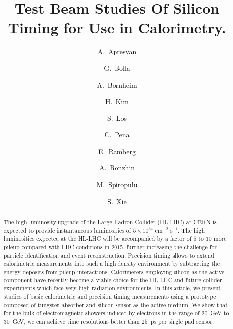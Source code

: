 \documentclass[preprint,1p]{elsarticle}
\begin{document}
\linenumbers

\begin{frontmatter}



\title{Test Beam Studies Of Silicon Timing for Use in Calorimetry.}


\author[1]{A.~Apresyan}
\author[2]{G.~Bolla}
\author[1]{A.~Bornheim}
\author[3]{H.~Kim}
\author[2]{S.~Los}
\author[1]{C.~Pena}
\author[2]{E.~Ramberg}
\author[2]{A.~Ronzhin}
\author[1]{M.~Spiropulu}
\author[1]{S.~Xie}
\address[1]{California Institute of Technology, Pasadena, CA, USA}
\address[2]{Fermi National Accelerator Laboratory, Batavia, IL, USA}
\address[3]{University of Chicago, Chicago, IL,  USA}

\begin{abstract}
The high luminosity upgrade of the Large Hadron Collider (HL-LHC) at CERN is
expected to provide instantaneous luminosities of $5\times 10^{34}$ cm$^{-2}$
s$^{-1}$. The high luminosities expected at the HL-LHC will be accompanied by a
factor of $5$ to $10$ more pileup compared with LHC conditions in $2015$,
further increasing the challenge for particle identification and event
reconstruction. Precision timing allows to extend calorimetric measurements into
such a high density environment by subtracting the energy deposits from pileup
interactions. Calorimeters employing silicon as the active component have
recently become a viable choice for the HL-LHC and future collider experiments
which face very high radiation environments. In this article, we present studies
of basic calorimetric and precision timing measurements using a prototype
composed of tungsten absorber and silicon sensor as the active medium. We show
that for the bulk of electromagnetic showers induced by electrons in the range
of $20$~GeV to $30$~GeV, we can achieve time resolutions better than $25$~ps per
single pad sensor. 


\end{abstract}
\end{frontmatter}
\end{document}
